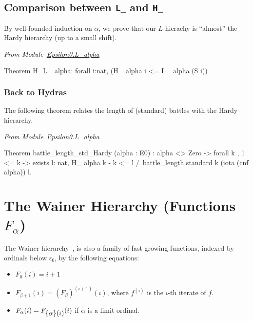 \subsection{Comparison between \texttt{L\_} and \texttt{H\_} }

By well-founded induction on $\alpha$, we prove that our $L$ hierachy is ``almost'' the Hardy hierarchy (up to a small shift).

\emph{From Module~\href{../theories/html/hydras.Epsilon0.L_alpha.html\#H_L_}{Epsilon0.L\_alpha}}

\begin{Coqsrc}
 Theorem H_L_ alpha: forall i:nat,  (H_ alpha i <= L_ alpha (S i))%
\end{Coqsrc}
 
\subsubsection{Back to Hydras}

The following theorem relates the length of (standard) battles with the Hardy hierarchy.

\emph{From Module~\href{../theories/html/hydras.Epsilon0.L_alpha.html}{Epsilon0.L\_alpha}}

\begin{Coqsrc}
Theorem battle_length_std_Hardy (alpha : E0) :
  alpha <> Zero ->
  forall k , 1 <= k -> exists l: nat,  
       H_ alpha k - k <= l /\
       battle_length standard k (iota (cnf alpha)) l.    
\end{Coqsrc}



\section{The Wainer Hierarchy (Functions \texorpdfstring{$F_\alpha$}{F\_alpha})}
\label{sect:wainer}


The Wainer hierarchy~\cite{BW85, Wainer1970, KS81}, is also a family of fast growing functions, indexed by ordinals below $\epsilon_0$, by the following equations:

\label{F_equations}
\begin{itemize}
\item $F_0(i)=i+1$
\item $F_{\beta+1}(i)= (F_\beta)^{(i+1)}(i)$, where $f^{(i)}$ is the $i$-th iterate of $f$.
\item $F_\alpha(i) = F_{\mbox{$\{\alpha\}(i)$}} (i)$ if $\alpha$ is a limit ordinal.
\end{itemize}


